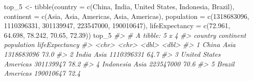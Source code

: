 \documentclass[
]{book}
\newenvironment{Shaded}{\begin{snugshade}}{\end{snugshade}}
\newcommand{\AttributeTok}[1]{\textcolor[rgb]{0.77,0.63,0.00}{#1}}
\newcommand{\CommentTok}[1]{\textcolor[rgb]{0.56,0.35,0.01}{\textit{#1}}}
\newcommand{\DecValTok}[1]{\textcolor[rgb]{0.00,0.00,0.81}{#1}}
\newcommand{\FloatTok}[1]{\textcolor[rgb]{0.00,0.00,0.81}{#1}}
\newcommand{\FunctionTok}[1]{\textcolor[rgb]{0.00,0.00,0.00}{#1}}
\newcommand{\NormalTok}[1]{#1}
\newcommand{\OtherTok}[1]{\textcolor[rgb]{0.56,0.35,0.01}{#1}}
\newcommand{\StringTok}[1]{\textcolor[rgb]{0.31,0.60,0.02}{#1}}
\begin{document}
\begin{Shaded}
\begin{Highlighting}[]
\NormalTok{top\_5 }\OtherTok{\textless{}{-}} \FunctionTok{tibble}\NormalTok{(}\AttributeTok{country =} \FunctionTok{c}\NormalTok{(}\StringTok{\textquotesingle{}China\textquotesingle{}}\NormalTok{, }\StringTok{\textquotesingle{}India\textquotesingle{}}\NormalTok{, }\StringTok{\textquotesingle{}United States\textquotesingle{}}\NormalTok{, }\StringTok{\textquotesingle{}Indonesia\textquotesingle{}}\NormalTok{, }\StringTok{\textquotesingle{}Brazil\textquotesingle{}}\NormalTok{),}
                \AttributeTok{continent =} \FunctionTok{c}\NormalTok{(}\StringTok{\textquotesingle{}Asia\textquotesingle{}}\NormalTok{, }\StringTok{\textquotesingle{}Asia\textquotesingle{}}\NormalTok{, }\StringTok{\textquotesingle{}Americas\textquotesingle{}}\NormalTok{, }\StringTok{\textquotesingle{}Asia\textquotesingle{}}\NormalTok{, }\StringTok{\textquotesingle{}Americas\textquotesingle{}}\NormalTok{),}
                \AttributeTok{population =} \FunctionTok{c}\NormalTok{(}\DecValTok{1318683096}\NormalTok{, }\DecValTok{1110396331}\NormalTok{, }\DecValTok{301139947}\NormalTok{, }\DecValTok{223547000}\NormalTok{, }\DecValTok{190010647}\NormalTok{),}
                \AttributeTok{lifeExpectancy =} \FunctionTok{c}\NormalTok{(}\FloatTok{72.961}\NormalTok{, }\FloatTok{64.698}\NormalTok{, }\FloatTok{78.242}\NormalTok{, }\FloatTok{70.65}\NormalTok{, }\FloatTok{72.39}\NormalTok{))}
\NormalTok{top\_5}
\CommentTok{\#\textgreater{} \# A tibble: 5 x 4}
\CommentTok{\#\textgreater{}   country       continent population lifeExpectancy}
\CommentTok{\#\textgreater{}   \textless{}chr\textgreater{}         \textless{}chr\textgreater{}          \textless{}dbl\textgreater{}          \textless{}dbl\textgreater{}}
\CommentTok{\#\textgreater{} 1 China         Asia      1318683096           73.0}
\CommentTok{\#\textgreater{} 2 India         Asia      1110396331           64.7}
\CommentTok{\#\textgreater{} 3 United States Americas   301139947           78.2}
\CommentTok{\#\textgreater{} 4 Indonesia     Asia       223547000           70.6}
\CommentTok{\#\textgreater{} 5 Brazil        Americas   190010647           72.4}


\end{Highlighting}
\end{Shaded}
\end{document}
